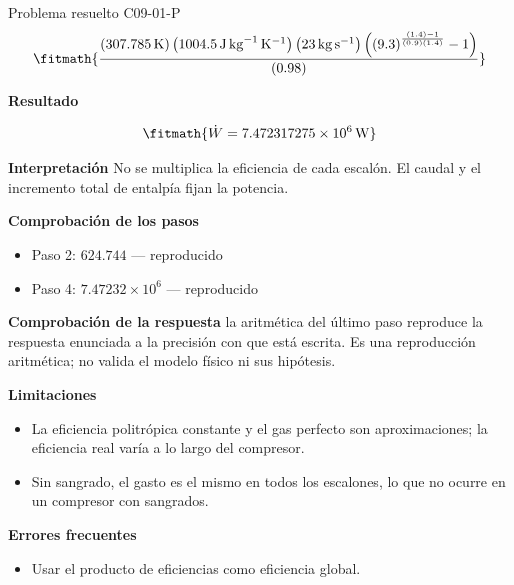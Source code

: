\documentclass[10pt,openany]{book}
\begin{document}
\begin{studiumworked}{Problema resuelto C09-01-P}
\[
\fitmath{\frac{\left(307.785\,\mathrm{K}\right) \left(1004.5\,\mathrm{J}\,\mathrm{kg}^{-1}\,\mathrm{K}^{-1}\right) \left(23\,\mathrm{kg}\,\mathrm{s}^{-1}\right) \left(\left(9.3\right)^{\frac{\left(1.4\right) - 1}{\left(0.9\right) \left(1.4\right)}} - 1\right)}{\left(0.98\right)}}
\]

\noindent\textbf{Resultado}

\[
\fitmath{\dot{W}=7.472317275\times10^{6}\,\mathrm{W}}
\]

\noindent\textbf{Interpretación}
No se multiplica la eficiencia de cada escalón. El caudal y el incremento total de entalpía fijan la potencia.

\noindent\textbf{Comprobación de los pasos}
\begin{itemize}
\item Paso 2: $624.744$ — reproducido
\item Paso 4: $7.47232\times 10^{6}$ — reproducido
\end{itemize}

\noindent\textbf{Comprobación de la respuesta} la aritmética del último paso reproduce la respuesta enunciada a la precisión con que está escrita. Es una reproducción aritmética; no valida el modelo físico ni sus hipótesis.

\noindent\textbf{Limitaciones}
\begin{itemize}
\item La eficiencia politrópica constante y el gas perfecto son aproximaciones; la eficiencia real varía a lo largo del compresor.
\item Sin sangrado, el gasto es el mismo en todos los escalones, lo que no ocurre en un compresor con sangrados.
\end{itemize}

\noindent\textbf{Errores frecuentes}
\begin{itemize}
\item Usar el producto de eficiencias como eficiencia global.
\end{itemize}
\end{studiumworked}
\end{document}
